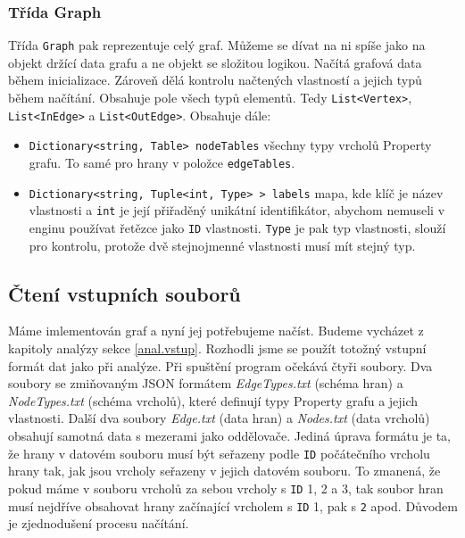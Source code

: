 \subsubsection{Třída Graph}

Třída \texttt{Graph} pak reprezentuje celý graf.
Můžeme se dívat na ni spíše jako na objekt držící data grafu a ne objekt se složitou logikou.
Načítá grafová data během inicializace.
Zároveň dělá kontrolu načtených vlastností a jejich typů během načítání.
Obsahuje pole všech typů elementů. Tedy \texttt{List<Vertex>}, \texttt{List<InEdge>} a \texttt{List<OutEdge>}.
Obsahuje dále:
\begin{itemize}
\item \texttt{Dictionary<string, Table> nodeTables} všechny typy vrcholů Property grafu. To samé pro hrany v položce \texttt{edgeTables}.
\item \texttt{Dictionary<string, Tuple<int, Type> > labels} mapa, kde klíč je název vlastnosti a \texttt{int} je její přiřaděný unikátní identifikátor, abychom nemuseli v enginu používat řetězce jako \texttt{ID} vlastnosti.
\texttt{Type} je pak typ vlastnosti, slouží pro kontrolu, protože dvě stejnojmenné vlastnosti musí mít stejný typ. 
\end{itemize}


\subsection{Čtení vstupních souborů} \label{impl.vstup}

Máme imlementován graf a nyní jej potřebujeme načíst.
Budeme vycházet z kapitoly analýzy sekce \ref{anal.vstup}.
Rozhodli jsme se použít totožný vstupní formát dat jako při analýze.
Při spuštění program očekává čtyři soubory.
Dva soubory se zmiňovaným JSON formátem \textit{EdgeTypes.txt} (schéma hran) a \textit{NodeTypes.txt} (schéma vrcholů), které definují typy Property grafu a jejich vlastnosti.
Další dva soubory \textit{Edge.txt} (data hran) a \textit{Nodes.txt} (data vrcholů) obsahují samotná data s mezerami jako oddělovače.
Jediná úprava formátu je ta, že hrany v datovém souboru musí být seřazeny podle \texttt{ID} počátečního vrcholu hrany tak, jak jsou vrcholy seřazeny v jejich datovém souboru.
To zmanená, že pokud máme v souboru vrcholů za sebou vrcholy s \texttt{ID} 1, 2 a 3, tak soubor hran musí nejdříve obsahovat hrany začínající vrcholem s \texttt{ID} 1, pak s \texttt{2} apod.
Důvodem je zjednodušení procesu načítání.


